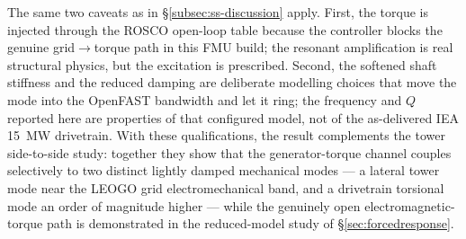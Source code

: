 The same two caveats as in \S\ref{subsec:ss-discussion} apply. First, the torque
is injected through the ROSCO open-loop table because the controller blocks the
genuine grid\(\to\)torque path in this FMU build; the resonant amplification is
real structural physics, but the excitation is prescribed. Second, the softened
shaft stiffness and the reduced damping are deliberate modelling choices that
move the mode into the OpenFAST bandwidth and let it ring; the frequency and
\(Q\) reported here are properties of that configured model, not of the
as-delivered IEA \SI{15}{\mega\watt} drivetrain. With these qualifications, the
result complements the tower side-to-side study: together they show that the
generator-torque channel couples selectively to two distinct lightly damped
mechanical modes --- a lateral tower mode near the LEOGO grid electromechanical
band, and a drivetrain torsional mode an order of magnitude higher --- while the
genuinely open electromagnetic-torque path is demonstrated in the reduced-model
study of \S\ref{sec:forcedresponse}.
